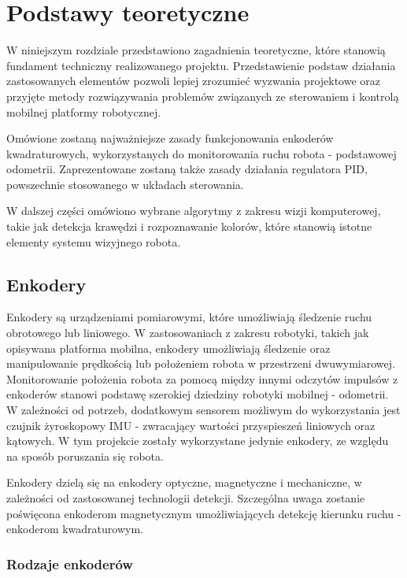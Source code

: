\chapter{Podstawy teoretyczne}
\label{ch:podstawy-teoretyczne}

W niniejszym rozdziale przedstawiono zagadnienia teoretyczne, które stanowią fundament techniczny realizowanego projektu. Przedstawienie podstaw działania zastosowanych elementów pozwoli lepiej zrozumieć wyzwania projektowe oraz przyjęte metody rozwiązywania problemów związanych ze sterowaniem i kontrolą mobilnej platformy robotycznej.

Omówione zostaną najważniejsze zasady funkcjonowania enkoderów kwadraturowych, wykorzystanych do monitorowania ruchu robota - podstawowej odometrii. Zaprezentowane zostaną także zasady działania regulatora PID, powszechnie stosowanego w układach sterowania.

W dalszej części omówiono wybrane algorytmy z zakresu wizji komputerowej, takie jak detekcja krawędzi i rozpoznawanie kolorów, które stanowią istotne elementy systemu wizyjnego robota.

\section{Enkodery}
Enkodery są urządzeniami pomiarowymi, które umożliwiają śledzenie ruchu obrotowego lub liniowego. W zastosowaniach z zakresu robotyki, takich jak opisywana platforma mobilna, enkodery umożliwiają śledzenie oraz manipulowanie prędkością lub położeniem robota w przestrzeni dwuwymiarowej. Monitorowanie położenia robota za pomocą między innymi odczytów impulsów z enkoderów stanowi podstawę szerokiej dziedziny robotyki mobilnej - odometrii. W zależności od potrzeb, dodatkowym sensorem możliwym do wykorzystania jest czujnik żyroskopowy IMU - zwracający wartości przyspieszeń liniowych oraz kątowych. W tym projekcie zostały wykorzystane jedynie enkodery, ze względu na sposób poruszania się robota. 

Enkodery dzielą się na enkodery optyczne, magnetyczne i mechaniczne, w zależności od zastosowanej technologii detekcji. Szczególna uwaga zostanie poświęcona enkoderom magnetycznym umożliwiających detekcję kierunku ruchu - enkoderom kwadraturowym. 

\subsection{Rodzaje enkoderów}

